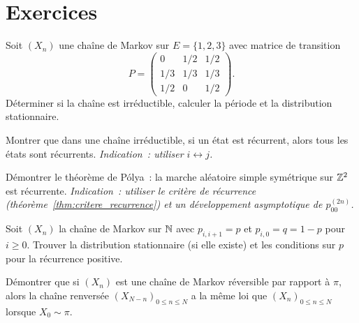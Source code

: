 \section{Exercices}

\begin{exercice}
Soit $(X_n)$ une cha\^ine de Markov sur $E = \{1, 2, 3\}$ avec matrice de transition
\[
  P = \begin{pmatrix} 0 & 1/2 & 1/2 \\ 1/3 & 1/3 & 1/3 \\ 1/2 & 0 & 1/2 \end{pmatrix}.
\]
D\'eterminer si la cha\^ine est irr\'eductible, calculer la p\'eriode et la distribution
stationnaire.
\end{exercice}

\begin{exercice}
Montrer que dans une cha\^ine irr\'eductible, si un \'etat est r\'ecurrent, alors tous
les \'etats sont r\'ecurrents. \emph{Indication~: utiliser $i \leftrightarrow j$.}
\end{exercice}

\begin{exercice}
D\'emontrer le th\'eor\`eme de P\'olya~: la marche al\'eatoire simple sym\'etrique
sur $\mathbb{Z}^2$ est r\'ecurrente. \emph{Indication~: utiliser le crit\`ere de r\'ecurrence
(th\'eor\`eme~\ref{thm:critere_recurrence}) et un d\'eveloppement asymptotique de
$p_{00}^{(2n)}$.}
\end{exercice}

\begin{exercice}
Soit $(X_n)$ la cha\^ine de Markov sur $\mathbb{N}$ avec $p_{i,i+1} = p$ et $p_{i,0} = q = 1-p$
pour $i \geq 0$. Trouver la distribution stationnaire (si elle existe) et les
conditions sur $p$ pour la r\'ecurrence positive.
\end{exercice}

\begin{exercice}
D\'emontrer que si $(X_n)$ est une cha\^ine de Markov r\'eversible par rapport \`a
$\pi$, alors la cha\^ine renvers\'ee $(X_{N-n})_{0 \leq n \leq N}$ a la m\^eme loi
que $(X_n)_{0 \leq n \leq N}$ lorsque $X_0 \sim \pi$.
\end{exercice}
